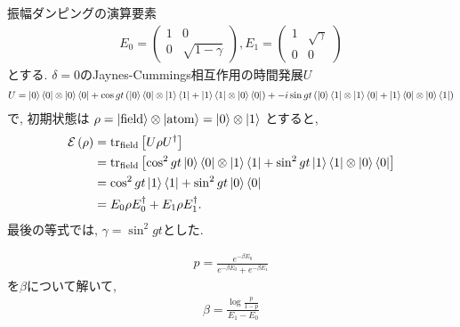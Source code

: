 \begin{ex}
    \label{ex8.24}
    振幅ダンピングの演算要素
    \begin{align*}
        E_0 =
        \begin{pmatrix}
            1 & 0                \\
            0 & \sqrt{1- \gamma}
        \end{pmatrix}
        ,
        E_1 =
        \begin{pmatrix}
            1 & \sqrt{\gamma} \\
            0 & 0
        \end{pmatrix}
    \end{align*}
    とする.
    $\delta = 0$のJaynes-Cummings相互作用の時間発展$U$
    \begin{align*}
        U =
        \ket{0}\bra{0} \otimes \ket{0} \bra{0}
        +
        \cos gt \left(
        \ket{0}\bra{0} \otimes \ket{1} \bra{1} + \ket{1}\bra{1} \otimes \ket{0} \bra{0}
        \right)
        +
        -i \sin gt \left(
        \ket{0}\bra{1} \otimes \ket{1} \bra{0} + \ket{1}\bra{0} \otimes \ket{0} \bra{1}
        \right)
    \end{align*}
    で, 初期状態は $ \rho = \ket{ \mathrm{field}} \otimes \ket{\mathrm{atom}} = \ket{0} \otimes \ket{1}$
    とすると,
    \begin{align*}
        \mathcal{E} \left( \rho\right)
         & =
        \mathrm{tr}_\mathrm{field} \left[ U \rho U^\dagger \right]   \\
         & =
        \mathrm{tr}_\mathrm{field} \left[
            \cos^2 gt  \ket{0}\bra{0} \otimes \ket{1} \bra{1}
            +
            \sin^2 gt  \ket{1}\bra{1} \otimes \ket{0} \bra{0}
            \right]                                          \\
         & =
        \cos^2 gt \ket{1}\bra{1} + \sin^2 gt \ket{0} \bra{0} \\
         & =E_0 \rho E_0^\dagger + E_1 \rho E_1^\dagger.
    \end{align*}
    最後の等式では, $\gamma = \sin^2 gt$とした.
\end{ex}

\begin{ex}
    \label{ex8.25}
    \begin{align*}
        p = \frac{e^{- \beta E_0}}{e^{- \beta E_0} + e^{- \beta E_1}}
    \end{align*}
    を$\beta$について解いて,
    \begin{align*}
        \beta = \frac{\log\frac{p}{1-p}}{E_1 - E_0}
    \end{align*}
\end{ex}

